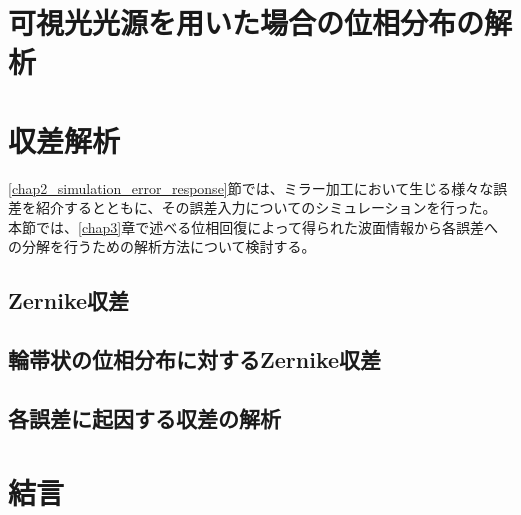 \clearpage
\newpage

\section{可視光光源を用いた場合の位相分布の解析}
\label{chap2_error_response_visible}



\clearpage
\newpage
\section{収差解析}
\label{chap2_simulation_zernike_analysis}

\ref{chap2_simulation_error_response}節では、ミラー加工において生じる様々な誤差を紹介するとともに、その誤差入力についてのシミュレーションを行った。
本節では、\ref{chap3}章で述べる位相回復によって得られた波面情報から各誤差への分解を行うための解析方法について検討する。

\subsection{Zernike収差}

\subsection{輪帯状の位相分布に対するZernike収差}


\subsection{各誤差に起因する収差の解析}



\section{結言}
\label{chap2_conclusion}



